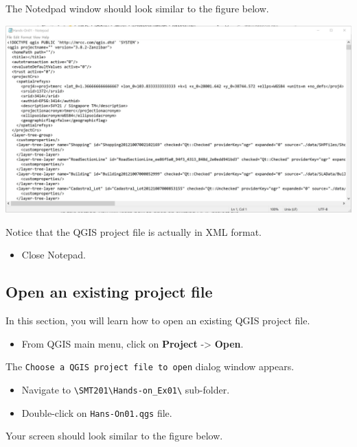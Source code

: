 \documentclass[
  letterpaper,
  DIV=11,
  numbers=noendperiod]{scrreprt}
\providecommand{\tightlist}{%
  \setlength{\itemsep}{0pt}\setlength{\parskip}{0pt}}\usepackage{longtable,booktabs,array}
\begin{document}
The Notedpad window should look similar to the figure below.

\includegraphics{./img/image1-6.jpg}

Notice that the QGIS project file is actually in XML format.

\begin{itemize}
\tightlist
\item
  Close Notepad.
\end{itemize}

\hypertarget{open-an-existing-project-file}{%
\subsection{Open an existing project
file}\label{open-an-existing-project-file}}

In this section, you will learn how to open an existing QGIS project
file.

\begin{itemize}
\tightlist
\item
  From QGIS main menu, click on \textbf{Project} -\textgreater{}
  \textbf{Open}.
\end{itemize}

The \texttt{Choose\ a\ QGIS\ project\ file\ to\ open} dialog window
appears.

\begin{itemize}
\tightlist
\item
  Navigate to
  \texttt{\textbackslash{}SMT201\textbackslash{}Hands-on\_Ex01\textbackslash{}}
  sub-folder.
\item
  Double-click on \texttt{Hans-On01.qgs} file.
\end{itemize}

Your screen should look similar to the figure below.
\end{document}
